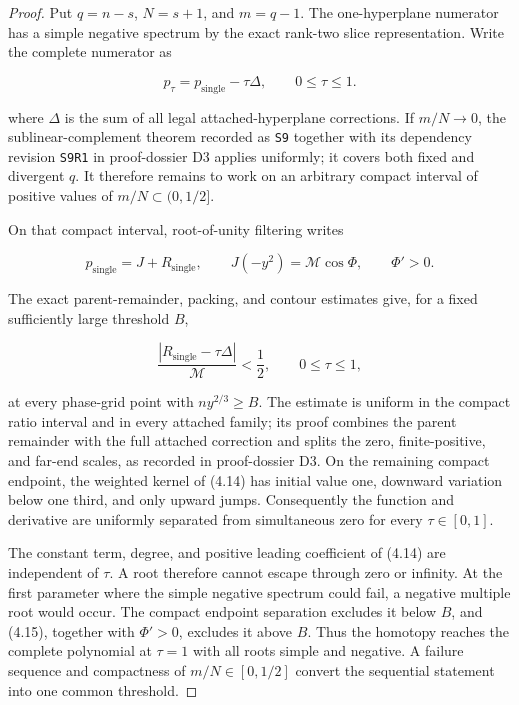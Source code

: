 \documentclass[10pt]{article}
\begin{document}
\begin{proof}


Put $q=n-s$, $N=s+1$, and $m=q-1$.  The one-hyperplane numerator has a
simple negative spectrum by the exact rank-two slice representation.  Write
the complete numerator as

\[
 p_\tau=p_{\mathrm{single}}-\tau\Delta,
 \qquad 0\le\tau\le1. \tag{4.14}
\]

where $\Delta$ is the sum of all legal attached-hyperplane corrections.
If $m/N\to0$, the sublinear-complement theorem recorded as \texttt{S9} together
with its dependency revision \texttt{S9R1} in proof-dossier D3 applies uniformly; it
covers both fixed and divergent $q$.  It therefore remains to work on an
arbitrary compact interval of positive values of $m/N\subset(0,1/2]$.

On that compact interval, root-of-unity filtering writes

\[
 p_{\mathrm{single}}=J+R_{\mathrm{single}},
 \qquad J(-y^2)=\mathcal M\cos\Phi,
 \qquad \Phi'>0. \tag{4.14a}
\]

The exact parent-remainder, packing, and contour estimates give, for a fixed
sufficiently large threshold $B$,

\[
 \frac{|R_{\mathrm{single}}-\tau\Delta|}{\mathcal M}<\frac12,
 \qquad 0\le\tau\le1, \tag{4.15}
\]

at every phase-grid point with $ny^{2/3}\ge B$.  The estimate is uniform in
the compact ratio interval and in every attached family; its proof combines
the parent remainder with the full attached correction and splits the zero,
finite-positive, and far-end scales, as recorded in proof-dossier D3.  On the
remaining compact endpoint, the weighted kernel of (4.14) has initial value
one, downward variation below one third, and only upward jumps.  Consequently
the function and derivative are uniformly separated from simultaneous zero
for every $\tau\in[0,1]$.

The constant term, degree, and positive leading coefficient of (4.14) are
independent of $\tau$.  A root therefore cannot escape through zero or
infinity.  At the first parameter where the simple negative spectrum could
fail, a negative multiple root would occur.  The compact endpoint separation
excludes it below $B$, and (4.15), together with $\Phi'>0$, excludes it
above $B$.  Thus the homotopy reaches the complete polynomial at $\tau=1$
with all roots simple and negative.  A failure sequence and compactness of
$m/N\in[0,1/2]$ convert the sequential statement into one common threshold.

\end{proof}
\end{document}
